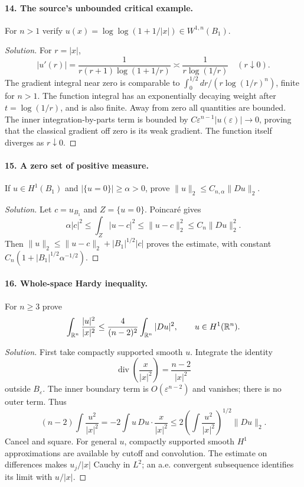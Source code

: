 \paragraph{14. The source's unbounded critical example.}
For $n>1$ verify $u(x)=\log\log(1+1/|x|)\in W^{1,n}(B_1)$.
\begin{proof}[Solution]
For $r=|x|$,
\[
 |u'(r)|=\frac1{r(r+1)\log(1+1/r)}
 \asymp\frac1{r\log(1/r)}\quad(r\downarrow0).
\]
The gradient integral near zero is comparable to
$\int_0^{1/2}dr/(r\log(1/r)^n)$, finite for $n>1$.
The function integral has an exponentially decaying weight after
$t=\log(1/r)$, and is also finite. Away from zero all quantities are
bounded. The inner integration-by-parts term is bounded by
$C\varepsilon^{n-1}|u(\varepsilon)|\to0$, proving that the classical
gradient off zero is its weak gradient.
The function itself diverges as $r\downarrow0$.
\end{proof}

\paragraph{15. A zero set of positive measure.}
If $u\in H^1(B_1)$ and $|\{u=0\}|\geq\alpha>0$, prove
$\|u\|_2\leq C_{n,\alpha}\|Du\|_2$.
\begin{proof}[Solution]
Let $c=u_{B_1}$ and $Z=\{u=0\}$. Poincaré gives
\[
 \alpha|c|^2\leq\int_Z|u-c|^2
 \leq\|u-c\|_2^2\leq C_n\|Du\|_2^2.
\]
Then $\|u\|_2\leq\|u-c\|_2+|B_1|^{1/2}|c|$ proves the estimate,
with constant $C_n(1+|B_1|^{1/2}\alpha^{-1/2})$.
\end{proof}

\paragraph{16. Whole-space Hardy inequality.}
For $n\geq3$ prove
\[
 \int_{\mathbb{R}^n}\frac{|u|^2}{|x|^2}
 \leq\frac4{(n-2)^2}\int_{\mathbb{R}^n}|Du|^2,\qquad u\in H^1(\mathbb{R}^n).
\]
\begin{proof}[Solution]
First take compactly supported smooth $u$. Integrate the identity
\[
 \operatorname{div}\left(\frac{x}{|x|^2}\right)
 =\frac{n-2}{|x|^2}
\]
outside $B_\varepsilon$.
The inner boundary term is $O(\varepsilon^{n-2})$ and vanishes;
there is no outer term. Thus
\[
 (n-2)\int\frac{u^2}{|x|^2}
 =-2\int u\,Du\cdot\frac{x}{|x|^2}
 \leq2\left(\int\frac{u^2}{|x|^2}\right)^{1/2}\|Du\|_2.
\]
Cancel and square. For general $u$, compactly supported smooth
$H^1$ approximations are available by cutoff and convolution.
The estimate on differences makes $u_j/|x|$ Cauchy in $L^2$;
an a.e. convergent subsequence identifies its limit with $u/|x|$.
\end{proof}
\Needspace{45mm}

